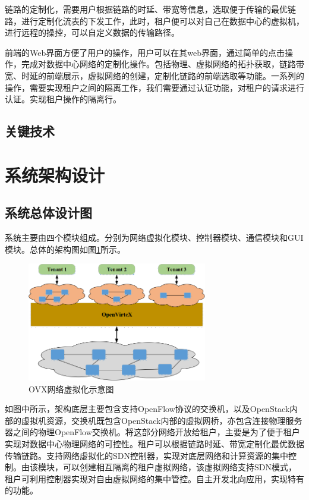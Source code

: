 链路的定制化，需要用户根据链路的时延、带宽等信息，选取便于传输的最优链路，进行定制化流表的下发工作，此时，租户便可以对自己在数据中心的虚拟机，进行远程的操控，可以自定义数据的传输路径。

前端的Web界面方便了用户的操作，用户可以在其web界面，通过简单的点击操作，完成对数据中心网络的定制化操作。包括物理、虚拟网络的拓扑获取，链路带宽、时延的前端展示，虚拟网络的创建，定制化链路的前端选取等功能。一系列的操作，需要实现租户之间的隔离工作，我们需要通过认证功能，对租户的请求进行认证。实现租户操作的隔离行。

\subsection{关键技术}

\section{系统架构设计}
\subsection{系统总体设计图}
系统主要由四个模块组成。分别为网络虚拟化模块、控制器模块、通信模块和GUI模块。总体的架构图如图\ref{fig:ovx}所示。

\begin{figure}[!htb]
  \centering
  \includegraphics[width=0.7\textwidth]{logo/ovx.png}
  \caption{OVX网络虚拟化示意图}
  \label{fig:ovx}
\end{figure}

如图中所示，架构底层主要包含支持OpenFlow协议的交换机，以及OpenStack内部的虚拟机资源，交换机既包含OpenStack内部的虚拟网桥，亦包含连接物理服务器之间的物理OpenFlow交换机。将这部分网络开放给租户，主要是为了便于租户实现对数据中心物理网络的可控性。租户可以根据链路时延、带宽定制化最优数据传输链路。支持网络虚拟化的SDN控制器，实现对底层网络和计算资源的集中控制。由该模块，可以创建相互隔离的租户虚拟网络，该虚拟网络支持SDN模式，租户可利用控制器实现对自由虚拟网络的集中管控。自主开发北向应用，实现特有的功能。

